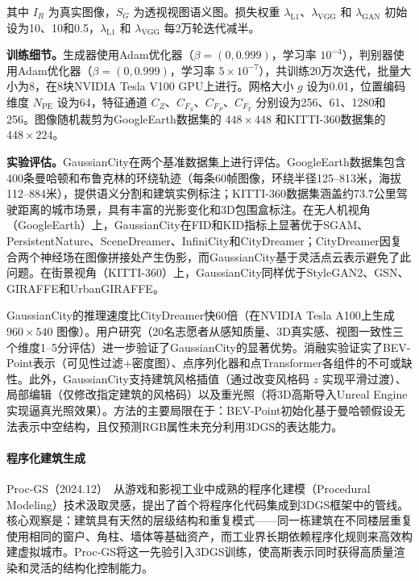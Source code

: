 其中 $I_R$ 为真实图像，$S_G$ 为透视视图语义图。损失权重 $\lambda_{\text{L1}}$、$\lambda_{\text{VGG}}$ 和 $\lambda_{\text{GAN}}$ 初始设为10、10和0.5，$\lambda_{\text{L1}}$ 和 $\lambda_{\text{VGG}}$ 每2万轮迭代减半。

\textbf{训练细节。}生成器使用Adam优化器（$\beta = (0, 0.999)$，学习率 $10^{-4}$），判别器使用Adam优化器（$\beta = (0, 0.999)$，学习率 $5 \times 10^{-7}$），共训练20万次迭代，批量大小为8，在8块NVIDIA Tesla V100 GPU上进行。网格大小 $g$ 设为0.01，位置编码维度 $N_{\text{PE}}$ 设为64，特征通道 $C_Z$、$C_{F_S}$、$C_{F_P}$、$C_{F_T}$ 分别设为256、61、1280和256。图像随机裁剪为GoogleEarth数据集的 $448 \times 448$ 和KITTI-360数据集的 $448 \times 224$。

\textbf{实验评估。}GaussianCity在两个基准数据集上进行评估。GoogleEarth数据集包含400条曼哈顿和布鲁克林的环绕轨迹（每条60帧图像，环绕半径125--813米，海拔112--884米），提供语义分割和建筑实例标注；KITTI-360数据集涵盖约73.7公里驾驶距离的城市场景，具有丰富的光影变化和3D包围盒标注。在无人机视角（GoogleEarth）上，GaussianCity在FID和KID指标上显著优于SGAM、PersistentNature、SceneDreamer、InfiniCity和CityDreamer；CityDreamer因复合两个神经场在图像拼接处产生伪影，而GaussianCity基于灵活点云表示避免了此问题。在街景视角（KITTI-360）上，GaussianCity同样优于StyleGAN2、GSN、GIRAFFE和UrbanGIRAFFE。

GaussianCity的推理速度比CityDreamer快60倍（在NVIDIA Tesla A100上生成 $960 \times 540$ 图像）。用户研究（20名志愿者从感知质量、3D真实感、视图一致性三个维度1--5分评估）进一步验证了GaussianCity的显著优势。消融实验证实了BEV-Point表示（可见性过滤+密度图）、点序列化器和点Transformer各组件的不可或缺性。此外，GaussianCity支持建筑风格插值（通过改变风格码 $z$ 实现平滑过渡）、局部编辑（仅修改指定建筑的风格码）以及重光照（将3D高斯导入Unreal Engine实现逼真光照效果）。方法的主要局限在于：BEV-Point初始化基于曼哈顿假设无法表示中空结构，且仅预测RGB属性未充分利用3DGS的表达能力。

\paragraph{程序化建筑生成}

Proc-GS（2024.12）~\cite{2412_07660}从游戏和影视工业中成熟的程序化建模（Procedural Modeling）技术汲取灵感，提出了首个将程序化代码集成到3DGS框架中的管线。核心观察是：建筑具有天然的层级结构和重复模式——同一栋建筑在不同楼层重复使用相同的窗户、角柱、墙体等基础资产，而工业界长期依赖程序化规则来高效构建虚拟城市。Proc-GS将这一先验引入3DGS训练，使高斯表示同时获得高质量渲染和灵活的结构化控制能力。

